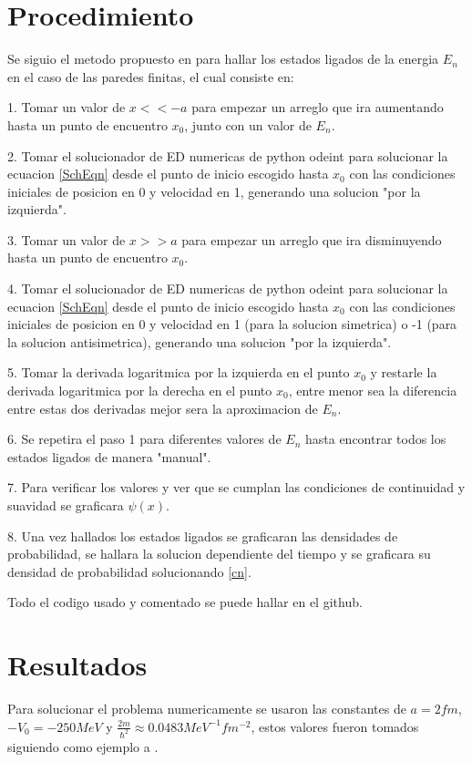 \documentclass[a4paper, twocolumn, 10pt]{article}
\begin{document}
\section{Procedimiento}
    Se siguio el metodo propuesto en \cite{computational-landau} para hallar los estados ligados de la energia $E_{n}$ en el caso de las paredes finitas, el cual consiste en:
    
    1. Tomar un valor de $x<<-a$ para empezar un arreglo que ira aumentando hasta un punto de encuentro $x_0$, junto con un valor de $E_n$.
    
    2. Tomar el solucionador de ED numericas de python odeint para solucionar la ecuacion \ref{SchEqn} desde el punto de inicio escogido hasta $x_0$ con las condiciones iniciales de posicion en 0 y velocidad en 1, generando una solucion "por la izquierda".
    
    3. Tomar un valor de $x>>a$ para empezar un arreglo que ira disminuyendo hasta un punto de encuentro $x_0$.
    
    4. Tomar el solucionador de ED numericas de python odeint para solucionar la ecuacion \ref{SchEqn} desde el punto de inicio escogido hasta $x_0$ con las condiciones iniciales de posicion en 0 y velocidad en 1 (para la solucion simetrica) o -1 (para la solucion antisimetrica), generando una solucion "por la izquierda".
    
    5. Tomar la derivada logaritmica por la izquierda en el punto $x_0$ y restarle la derivada logaritmica por la derecha en el punto $x_0$, entre menor sea la diferencia entre estas dos derivadas mejor sera la aproximacion de $E_n$.
    
    6. Se repetira el paso 1 para diferentes valores de $E_n$ hasta encontrar todos los estados ligados de manera "manual".
    
    7. Para verificar los valores y ver que se cumplan las condiciones de continuidad y suavidad se graficara $\psi(x)$.
    
    8. Una vez hallados los estados ligados se graficaran las densidades de probabilidad, se hallara la solucion dependiente del tiempo y se graficara su densidad de probabilidad solucionando \ref{cn}.
    
    Todo el codigo usado y comentado se puede hallar en el github.
    
\section{Resultados}
    Para solucionar el problema numericamente se usaron las constantes de $a=2fm$, $-V_{0}=-250MeV$ y $\frac{2m}{\hbar^{2}}\approx0.0483MeV^{-1}fm^{-2}$, estos valores fueron tomados siguiendo como ejemplo a \cite{computational-landau}.
\end{document}
